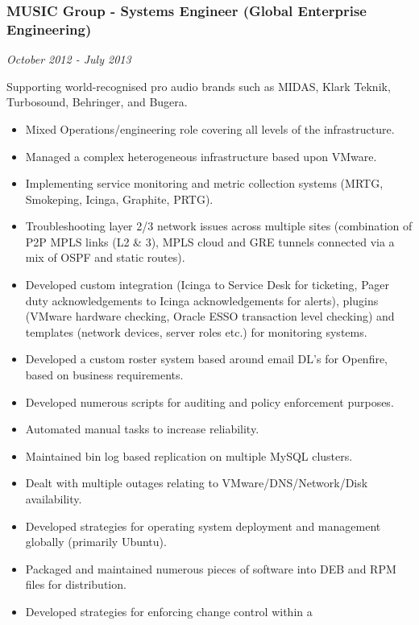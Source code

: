 \subsubsection{MUSIC Group - Systems Engineer (Global Enterprise
Engineering)}\label{music-group---systems-engineer-global-enterprise-engineering}

\emph{October 2012 - July 2013}

Supporting world-recognised pro audio brands such as MIDAS, Klark
Teknik, Turbosound, Behringer, and Bugera.

\begin{itemize}
\itemsep1pt\parskip0pt
\item
  Mixed Operations/engineering role covering all levels of the
  infrastructure.
\item
  Managed a complex heterogeneous infrastructure based upon VMware.
\item
  Implementing service monitoring and metric collection systems (MRTG,
  Smokeping, Icinga, Graphite, PRTG).
\item
  Troubleshooting layer 2/3 network issues across multiple sites
  (combination of P2P MPLS links (L2 \& 3), MPLS cloud and GRE tunnels
  connected via a mix of OSPF and static routes).
\item
  Developed custom integration (Icinga to Service Desk for ticketing,
  Pager duty acknowledgements to Icinga acknowledgements for alerts),
  plugins (VMware hardware checking, Oracle ESSO transaction level
  checking) and templates (network devices, server roles etc.) for
  monitoring systems.
\item
  Developed a custom roster system based around email DL's for Openfire,
  based on business requirements.
\item
  Developed numerous scripts for auditing and policy enforcement
  purposes.
\item
  Automated manual tasks to increase reliability.
\item
  Maintained bin log based replication on multiple MySQL clusters.
\item
  Dealt with multiple outages relating to VMware/DNS/Network/Disk
  availability.
\item
  Developed strategies for operating system deployment and management
  globally (primarily Ubuntu).
\item
  Packaged and maintained numerous pieces of software into DEB and RPM
  files for distribution.
\item
  Developed strategies for enforcing change control within a

\end{itemize}
